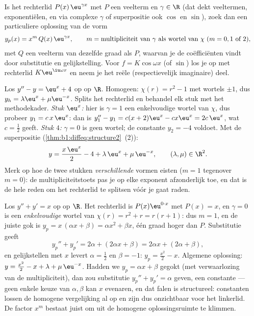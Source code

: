 \begin{method}[Particuliere oplossing bij $f(x) = P(x)\,\eu^{\gamma x}$]\label{met:b1:diffeq:particular}
Is het rechterlid $P(x)\,\eu^{\gamma x}$ met $P$ een veelterm en $\gamma
\in \R$ (dat dekt veeltermen, exponentiëlen, en via complexe $\gamma$ of
superpositie ook $\cos$ en $\sin$), zoek dan een particuliere oplossing
van de vorm
\[
y_p(x) = x^{m}\, Q(x)\, \eu^{\gamma x},
\qquad
m = \text{multipliciteit van } \gamma \text{ als wortel van } \chi
\ (m = 0, 1 \text{ of } 2),
\]
met $Q$ een veelterm van dezelfde graad als $P$, waarvan je de
coëfficiënten vindt door substitutie en gelijkstelling. Voor $f =
K\cos\omega x$ (of $\sin$) los je op met rechterlid $K\eu^{\iu\omega x}$
en neem je het reële (respectievelijk imaginaire) deel.
\end{method}

\begin{example}\label{ex:b1:diffeq:superposition}
Los $y'' - y = \eu^{x} + 4$ op op $\R$. Homogeen: $\chi(r) = r^2 - 1$ met
wortels $\pm1$, dus $y_h = \lambda\eu^x + \mu\eu^{-x}$. Splits het
rechterlid en behandel elk stuk met het methodekader. \emph{Stuk
$\eu^x$:} hier is $\gamma = 1$ een enkelvoudige wortel van $\chi$, dus
probeer $y_1 = c\,x\,\eu^x$: dan is $y_1'' - y_1 = c(x + 2)\eu^x -
cx\eu^x = 2c\,\eu^x$, wat $c = \frac12$ geeft. \emph{Stuk $4$:} $\gamma =
0$ is geen wortel; de constante $y_2 = -4$ voldoet. Met de superpositie
(\cref{thm:b1:diffeq:structure2}~(2)):
\[
y = \frac{x\,\eu^x}2 - 4 + \lambda\,\eu^x + \mu\,\eu^{-x},
\qquad (\lambda, \mu) \in \R^2 .
\]
Merk op hoe de twee stukken \emph{verschillende} vormen eisten ($m = 1$
tegenover $m = 0$): de multipliciteitstoets pas je op elke exponent
afzonderlijk toe, en dat is de hele reden om het rechterlid te splitsen
vóór je gaat raden.
\end{example}

\begin{example}\label{ex:b1:diffeq:multiplicity}
Los $y'' + y' = x$ op op $\R$. Het rechterlid is $P(x)\eu^{0 \cdot x}$
met $P(x) = x$, en $\gamma = 0$ is een \emph{enkelvoudige} wortel van
$\chi(r) = r^2 + r = r(r + 1)$: dus $m = 1$, en de juiste gok is $y_p =
x\,(\alpha x + \beta) = \alpha x^2 + \beta x$, één graad hoger dan $P$.
Substitutie geeft
\[
y_p'' + y_p' = 2\alpha + (2\alpha x + \beta)
= 2\alpha x + (2\alpha + \beta) ,
\]
en gelijkstellen met $x$ levert $\alpha = \frac12$ en $\beta = -1$: $y_p
= \frac{x^2}2 - x$. Algemene oplossing: $y = \frac{x^2}2 - x + \lambda +
\mu\,\eu^{-x}$. Hadden we $y_p = \alpha x + \beta$ gegokt (met
verwaarlozing van de multipliciteit), dan zou substitutie $y_p'' + y_p' =
\alpha$ geven, een constante --- geen enkele keuze van $\alpha, \beta$
kan $x$ evenaren, en dat falen is structureel: constanten lossen de
homogene vergelijking al op en zijn dus onzichtbaar voor het linkerlid.
De factor $x^m$ bestaat juist om uit de homogene oplossingsruimte te
klimmen.
\end{example}

